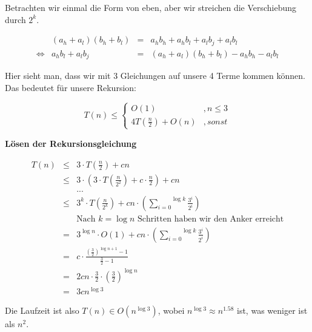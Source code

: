 Betrachten wir einmal die Form von eben, aber wir streichen die Verschiebung durch $2^k$.

$$
\begin{array}{crcl}
&\left( a_h + a_l \right) \left( b_h + b_l \right) &=& a_hb_h + a_hb_l + a_lb_j + a_lb_l\\
\Leftrightarrow& a_hb_l + a_lb_j &=& \left( a_h + a_l \right) \left( b_h + b_l \right) - a_hb_h - a_lb_l
\end{array}
$$

Hier sieht man, dass wir mit 3 Gleichungen auf unsere 4 Terme kommen können. Das bedeutet für unsere Rekursion:

$$
T(n) \leq \left\{ \begin{array}{lr}
O(1) &, n \leq 3\\
4 T(\frac{n}{2}) + O(n) &, sonst
\end{array} \right.
$$

\textbf{Lösen der Rekursionsgleichung}

$$
\begin{array}{rcl}
T(n) &\leq& 3 \cdot T\left( \frac{n}{2} \right) + cn\\
&\leq& 3 \cdot \left( 3 \cdot T \left( \frac{n}{2^2} \right) + c \cdot \frac{n}{2} \right) + cn\\
&& ... \\
&\leq& 3^k \cdot T\left( \frac{n}{2^k}\right) + cn \cdot \left( \overset{\log k}{\underset{i=0}{\sum}} \frac{3^i}{2^i}\right)\\
&& \text{Nach }k=\log n\text{ Schritten haben wir den Anker erreicht}\\
&=& 3^{\log n} \cdot O(1) + cn \cdot \left( \overset{\log k}{\underset{i=0}{\sum}} \frac{3^i}{2^i}\right)\\
&=& c\cdot \frac{\left( \frac{3}{2}\right)^{\log n + 1} - 1}{\frac{3}{2} - 1}\\
&=& 2cn\cdot \frac{3}{2} \cdot \left( \frac{3}{2} \right)^{\log n}\\
&=&3cn^{\log 3}
\end{array}
$$

Die Laufzeit ist also $T(n) \in O(n^{\log 3})$, wobei $n^{\log 3} \approx n^{1.58}$ ist, was weniger ist als $n^2$.